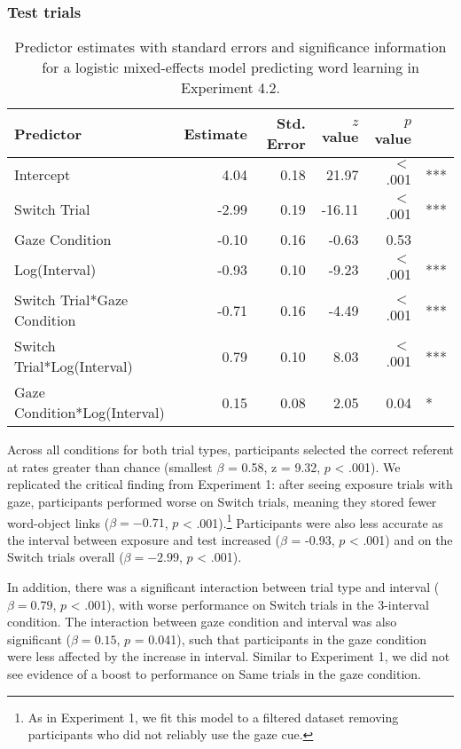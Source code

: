 \documentclass[oneside]{report}
\begin{document}
\subsubsection{Test trials}\label{test-trials-1}
\begin{table}[tb]
\centering
\begin{tabular}{lrrrrl}
 Predictor & Estimate & Std. Error & $z$ value & $p$ value &  \\ 
  \hline
Intercept & 4.04 & 0.18 & 21.97 & $<$ .001 & *** \\ 
  Switch Trial & -2.99 & 0.19 & -16.11 & $<$ .001 & *** \\ 
  Gaze Condition & -0.10 & 0.16 & -0.63 & 0.53 &  \\ 
  Log(Interval) & -0.93 & 0.10 & -9.23 & $<$ .001 & *** \\ 
  Switch Trial*Gaze Condition & -0.71 & 0.16 & -4.49 & $<$ .001 & *** \\ 
  Switch Trial*Log(Interval) & 0.79 & 0.10 & 8.03 & $<$ .001 & *** \\ 
  Gaze Condition*Log(Interval) & 0.15 & 0.08 & 2.05 & 0.04 & * \\ 
   \hline
\end{tabular}
\caption{Predictor estimates with standard errors and significance information for a logistic mixed-effects model predicting word learning in Experiment 4.2.} 
\label{tab:exp2_reg}
\end{table}
Across all conditions for both trial types, participants selected the
correct referent at rates greater than chance (smallest \(\beta\) =
0.58, z = 9.32, \(p\) \textless{} .001). We replicated the critical
finding from Experiment 1: after seeing exposure trials with gaze,
participants performed worse on Switch trials, meaning they stored fewer
word-object links (\(\beta = -0.71\), \(p\) \textless{}
.001).\footnote{As in Experiment 1, we fit this model to a filtered dataset removing participants who did not reliably use the gaze cue.}
Participants were also less accurate as the interval between exposure
and test increased (\(\beta\) = -0.93, \(p\) \textless{} .001) and on
the Switch trials overall (\(\beta = -2.99\), \(p\) \textless{} .001).

In addition, there was a significant interaction between trial type and
interval (\(\beta = 0.79\), \(p\) \textless{} .001), with worse
performance on Switch trials in the 3-interval condition. The
interaction between gaze condition and interval was also significant
(\(\beta = 0.15\), \(p\) = 0.041), such that participants in the gaze
condition were less affected by the increase in interval. Similar to
Experiment 1, we did not see evidence of a boost to performance on Same
trials in the gaze condition.
\end{document}

